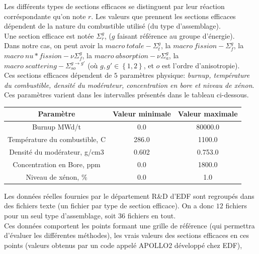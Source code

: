 Les différents types de sections efficaces se distinguent par leur réaction corréspondante qu'on note $r$.
Les valeurs que prennent les sections efficaces dépendent de la nature du combustible utilisé (du type d'assemblage).\\
Une section efficace est notée $\Sigma_r^g$, ($g$ faisant référence au groupe d'énergie).\\
\hspace{0.5cm}
Dans notre cas, on peut avoir la $macro\ totale-\Sigma_t^g$, la $macro\ fission-\Sigma_f^g$, la $macro\ nu*fission-\nu\Sigma_f^g$, la $macro\ absorption-\nu\Sigma_a^g$,
la $macro\ scattering-\Sigma_{so}^{g\rightarrow g'}$ (où $g,g' \in \left \{1,2\right\}$, et $o$ est l'ordre d'anisotropie).\\
Ces sections efficaces dépendent de $5$ paramètres physique: \textit{burnup, température du combustible, densité du modérateur, concentration en bore et niveau de xénon}.
Ces paramètres varient dans les intervalles présentés dans le tableau ci-dessous.\\
\begin{center}
\begin{table}
\begin{tabular}{|*{3}{c|}}
	\hline
	Paramètre 											& Valeur minimale & Valeur maximale \\
	\hline
	Burnup MWd/t 										& 0.0 						& 80000.0 \\
	\hline
	Température du combustible, C		& 286.0 					& 1100.0	\\
	\hline
	Densité du modérateur, g/cm3 		& 0.602 					& 0.753.0 \\
	\hline
	Concentration en Bore, ppm 			& 0.0 						& 1800.0 	\\
	\hline
	Niveau de xénon, \% 						& 0.0 						& 1.0 		\\
	\hline
\end{tabular}
\label{table:parametres}
\end{table}
\end{center}
\vspace{0.5cm}
\hspace{0.5cm}
Les données réelles fournies par le département R\&D d'EDF sont regroupés dans des fichiers texte (un fichier par type de section efficace).
On a donc $12$ fichiers pour un seul type d'assemblage, soit $36$ fichiers en tout.\\
Ces données comportent les points formant une grille de référence (qui permettra d'évaluer les différentes méthodes), les vrais valeurs des sections efficaces en ces points (valeurs obtenus par un code appelé APOLLO2 développé chez EDF),
